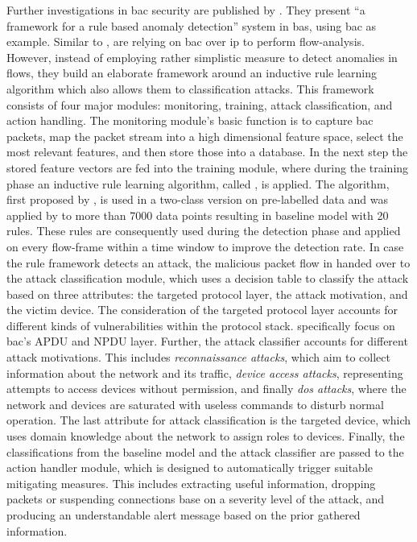 Further investigations in \gls{bac} security are published by \textcite{Pan2014}. They present \enquote{a framework for a rule based anomaly detection} system in \gls{bas}, using \gls{bac} as example.
Similar to \textcite{Celeda2012}, \textcite{Pan2014} are relying on \gls{bac} over \gls{ip} to perform flow-analysis.
However, instead of employing rather simplistic measure to detect anomalies in flows, they build an elaborate framework around an inductive rule learning algorithm which also allows them to classification attacks.
This framework consists of four major modules: monitoring, training, attack classification, and action handling.
The monitoring module's basic function is to capture \gls{bac} packets, map the packet stream into a high dimensional feature space, select the most relevant features, and then store those into a database.
In the next step the stored feature vectors are fed into the training module, where during the training phase an inductive rule learning algorithm, called , is applied.
The algorithm, first proposed by \textcite{Cohen1995}, is used in a two-class version on pre-labelled data and was applied by \textcite{Pan2014} to more than 7000 data points resulting in baseline model with 20 rules.
These rules are consequently used during the detection phase and applied on every flow-frame within a time window to improve the detection rate.
In case the rule framework detects an attack, the malicious packet flow in handed over to the attack classification module, which uses a decision table to classify the attack based on three attributes: the targeted protocol layer, the attack motivation, and the victim device.
The consideration of the targeted protocol layer accounts for different kinds of vulnerabilities within the protocol stack. \textcite{Pan2014} specifically focus on \gls{bac}'s APDU and NPDU layer.
Further, the attack classifier accounts for different attack motivations. This includes \emph{reconnaissance attacks}, which aim to collect information about the network and its traffic, \emph{device access attacks}, representing attempts to access devices without permission, and finally \emph{\gls{dos} attacks}, where the network and devices are saturated with useless commands to disturb normal operation.
The last attribute for attack classification is the targeted device, which uses domain knowledge about the network to assign roles to devices.
Finally, the classifications from the baseline model and the attack classifier are passed to the action handler module, which is designed to automatically trigger suitable mitigating measures. This includes extracting useful information, dropping packets or suspending connections base on a severity level of the attack, and producing an understandable alert message based on the prior gathered information.

